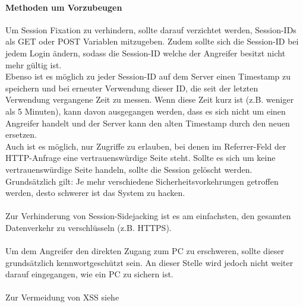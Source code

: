 \paragraph{Methoden um Vorzubeugen}
Um Session Fixation zu verhindern, sollte darauf verzichtet werden, Session-IDs als GET oder POST Variablen mitzugeben. Zudem sollte sich die Session-ID bei jedem Login ändern, sodass die Session-ID welche der Angreifer besitzt nicht mehr gültig ist.\\ Ebenso ist es möglich zu jeder Session-ID auf dem Server einen Timestamp zu speichern und bei erneuter Verwendung dieser ID, die seit der letzten Verwendung vergangene Zeit zu messen. Wenn diese Zeit kurz ist (z.B. weniger als 5 Minuten), kann davon ausgegangen werden, dass es sich nicht um einen Angreifer handelt und der Server kann den alten Timestamp durch den neuen ersetzen.\\ Auch ist es möglich, nur Zugriffe zu erlauben, bei denen im Referrer-Feld der HTTP-Anfrage eine vertrauenswürdige Seite steht. Sollte es sich um keine vertrauenswürdige Seite handeln, sollte die Session gelöscht werden.\\
Grundsätzlich gilt: Je mehr verschiedene Sicherheitsvorkehrungen getroffen werden, desto schwerer ist das System zu hacken.\\\\
Zur Verhinderung von Session-Sidejacking ist es am einfachsten, den gesamten Datenverkehr zu verschlüsseln (z.B. HTTPS). \\\\
Um dem Angreifer den direkten Zugang zum PC zu erschweren, sollte dieser grundsätzlich kennwortgeschützt sein. An dieser Stelle wird jedoch nicht weiter darauf eingegangen, wie ein PC zu sichern ist.\\\\
Zur Vermeidung von XSS siehe 